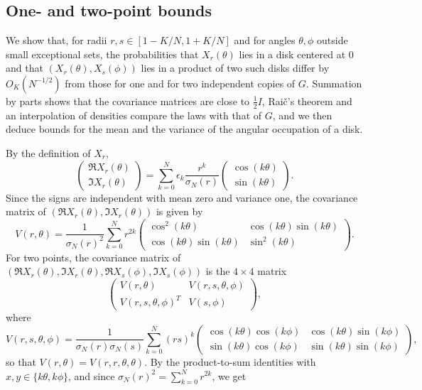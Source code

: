 \subsection{One- and two-point bounds}
\label{sec:h1-rademacher}
We show that, for radii $r,s\in[1-K/N,1+K/N]$ and for angles $\theta,\phi$
outside small exceptional sets, the probabilities that $X_r(\theta)$ lies
in a disk centered at $0$ and that $(X_r(\theta),X_s(\phi))$ lies in a
product of two such disks differ by $O_K(N^{-1/2})$ from those for one and
for two independent copies of $G$. Summation by parts shows that the
covariance matrices are close to $\tfrac12I$, Rai\v{c}'s theorem and an
interpolation of densities compare the laws with that of $G$, and we then
deduce bounds for the mean and the variance of the angular occupation of
a disk.

By the definition of $X_r$,
\[
 \begin{pmatrix}\Re X_r(\theta)\\ \Im X_r(\theta)\end{pmatrix}
 =\sum_{k=0}^N\epsilon_k\frac{r^k}{\sigma_N(r)}
 \begin{pmatrix}\cos(k\theta)\\ \sin(k\theta)\end{pmatrix}.
\]
Since the signs are independent with mean zero and variance one, the
covariance matrix of $(\Re X_r(\theta),\Im X_r(\theta))$ is given by
\[
 V(r,\theta)=\frac1{\sigma_N(r)^2}\sum_{k=0}^Nr^{2k}
 \begin{pmatrix}
 \cos^2(k\theta)&\cos(k\theta)\sin(k\theta)\\
 \cos(k\theta)\sin(k\theta)&\sin^2(k\theta)
 \end{pmatrix}.
\]
For two points, the covariance matrix of
$(\Re X_r(\theta),\Im X_r(\theta),\Re X_s(\phi),\Im X_s(\phi))$ is the
$4\times4$ matrix
\[
 \begin{pmatrix}
 V(r,\theta)&V(r,s,\theta,\phi)\\
 V(r,s,\theta,\phi)^T&V(s,\phi)
 \end{pmatrix},
\]
where
\[
 V(r,s,\theta,\phi)=\frac1{\sigma_N(r)\sigma_N(s)}\sum_{k=0}^N(rs)^k
 \begin{pmatrix}
 \cos(k\theta)\cos(k\phi)&\cos(k\theta)\sin(k\phi)\\
 \sin(k\theta)\cos(k\phi)&\sin(k\theta)\sin(k\phi)
 \end{pmatrix},
\]
so that $V(r,\theta)=V(r,r,\theta,\theta)$.
By the product-to-sum identities with $x,y\in\{k\theta,k\phi\}$, and
since $\sigma_N(r)^2=\sum_{k=0}^Nr^{2k}$, we get
